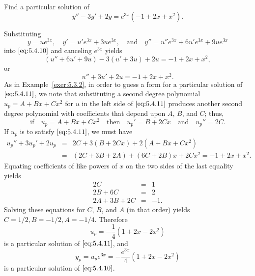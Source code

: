 \documentclass{ximera}
\begin{document}
\begin{example}\label{example:5.4.4}
Find a particular solution of
\begin{equation} \label{eq:5.4.10}
y''-3y'+2y=e^{3x}(-1+2x+x^2).
\end{equation}
 
\begin{explanation}
Substituting
$$
y=ue^{3x},\quad y'=u'e^{3x}+3ue^{3x},\quad\mbox{and}\quad
y''=u''e^{3x}+6u'e^{3x}+9ue^{3x}
$$
into $\eqref{eq:5.4.10}$ and  canceling $e^{3x}$  yields
$$
(u''+6u'+9u)-3(u'+3u)+2u=-1+2x+x^2,
$$
or
\begin{equation} \label{eq:5.4.11}
u''+3u'+2u=-1+2x+x^2.
\end{equation}
As in Example~\ref{exer:5.3.2}, in order to guess a form for a particular
solution of
$\eqref{eq:5.4.11}$, we note that substituting a second degree polynomial
$u_p=A+Bx+Cx^2$ for $u$ in the left side of $\eqref{eq:5.4.11}$ produces
another second degree polynomial with coefficients that depend upon
$A$, $B$, and $C$;   thus,
$$
\mbox{if}\quad u_p=A+Bx+Cx^2\quad\mbox{then}\quad
u_p'=B+2Cx\quad\mbox{and}\quad u_p''=2C.
$$
If $u_p$ is to satisfy $\eqref{eq:5.4.11}$,  we must have
\begin{eqnarray*}
u_p''+3u_p'+2u_p&=&2C+3(B+2Cx)+2(A+Bx+Cx^2)\\
&=&(2C+3B+2A)+(6C+2B)x+2Cx^2=-1+2x+x^2.
\end{eqnarray*}
Equating  coefficients of like powers of $x$ on the two sides of the
last equality yields
$$
\begin{array}{rcr}
2C&=&1\\
2B+6C&=&2\\
2A+3B+2C&=& -1.
\end{array}
$$
Solving these equations for $C$, $B$, and $A$ (in that order) yields
 $C=1/2,B=-1/2,A=-1/4$.  Therefore
$$
u_p=-\frac{1}{4}(1+2x-2x^2)
$$
is a particular solution of  $\eqref{eq:5.4.11}$, and
$$
y_p=u_pe^{3x}=-\frac{e^{3x}}{4}(1+2x-2x^2)
$$
is a particular solution of  $\eqref{eq:5.4.10}$.
\end{explanation}
\end{example}
 
\end{document}

